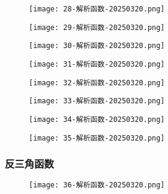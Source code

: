 \begin{figure}[H]
\centering
\texttt{[image: 28-解析函数-20250320.png]}
\label{}
\end{figure}

\begin{figure}[H]
\centering
\texttt{[image: 29-解析函数-20250320.png]}
\label{}
\end{figure}

\begin{exercise}
\begin{figure}[H]
\centering
\texttt{[image: 30-解析函数-20250320.png]}
\label{}
\end{figure}
\end{exercise}
\begin{figure}[H]
\centering
\texttt{[image: 31-解析函数-20250320.png]}
\label{}
\end{figure}

\begin{figure}[H]
\centering
\texttt{[image: 32-解析函数-20250320.png]}
\label{}
\end{figure}

\begin{exercise}
\begin{figure}[H]
\centering
\texttt{[image: 33-解析函数-20250320.png]}
\label{}
\end{figure}
\end{exercise}
\begin{figure}[H]
\centering
\texttt{[image: 34-解析函数-20250320.png]}
\label{}
\end{figure}

\begin{figure}[H]
\centering
\texttt{[image: 35-解析函数-20250320.png]}
\label{}
\end{figure}

\subsubsection{反三角函数}

\begin{figure}[H]
\centering
\texttt{[image: 36-解析函数-20250320.png]}
\label{}
\end{figure}

